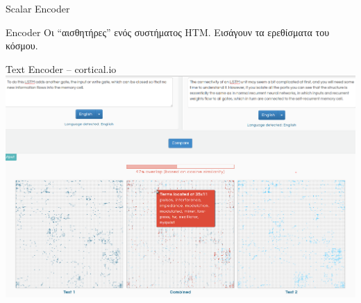 \documentclass[11pt,center]{beamer}
\begin{document}
\begin{frame}{Scalar Encoder}

  \begin{block}{Encoder}
    Οι ``αισθητήρες'' ενός συστήματος HTM. Εισάγουν τα ερεθίσματα του κόσμου.
  \end{block}

\end{frame}
\begin{frame}{Text Encoder -- cortical.io}
  \includegraphics[width=1.05\textwidth]{../pics/enc-cortical}
\end{frame}
\end{document}
